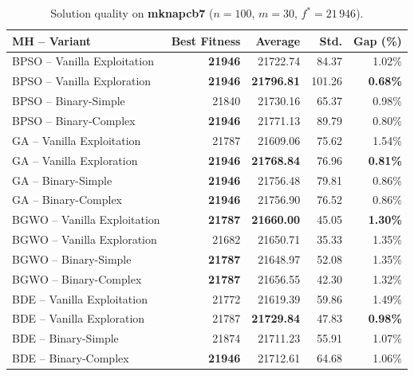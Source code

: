 \documentclass[journal,article,submit,moreauthors]{Definitions/mdpi}
\begin{document}
\begin{table}[htbp]
  \centering
  \small
  \caption{Solution quality on \textbf{mknapcb7}
  ($n=100$, $m=30$, $f^*=21\,946$).}
  \label{tab:calidad_mknapcb7}
  \begin{tabular}{lrrrr}
    \toprule
    \textbf{MH -- Variant} &
    \textbf{Best Fitness} &
    \textbf{Average} &
    \textbf{Std.} &
    \textbf{Gap (\%)} \\
    \midrule
    BPSO -- Vanilla Exploitation & \textbf{21946} & 21722.74 & 84.37 & 1.02\% \\
    BPSO -- Vanilla Exploration  & \textbf{21946} & \textbf{21796.81} & 101.26 & \textbf{0.68\%} \\
    BPSO -- Binary-Simple        & 21840 & 21730.16 & 65.37 & 0.98\% \\
    BPSO -- Binary-Complex       & \textbf{21946} & 21771.13 & 89.79 & 0.80\% \\
    \midrule
    GA -- Vanilla Exploitation   & 21787 & 21609.06 & 75.62 & 1.54\% \\
    GA -- Vanilla Exploration    & \textbf{21946} & \textbf{21768.84} & 76.96 & \textbf{0.81\%} \\
    GA -- Binary-Simple          & \textbf{21946} & 21756.48 & 79.81 & 0.86\% \\
    GA -- Binary-Complex         & \textbf{21946} & 21756.90 & 76.52 & 0.86\% \\
    \midrule
    BGWO -- Vanilla Exploitation & \textbf{21787} & \textbf{21660.00} & 45.05 & \textbf{1.30\%} \\
    BGWO -- Vanilla Exploration  & 21682 & 21650.71 & 35.33 & 1.35\% \\
    BGWO -- Binary-Simple        & \textbf{21787} & 21648.97 & 52.08 & 1.35\% \\
    BGWO -- Binary-Complex       & \textbf{21787} & 21656.55 & 42.30 & 1.32\% \\
    \midrule
    BDE -- Vanilla Exploitation  & 21772 & 21619.39 & 59.86 & 1.49\% \\
    BDE -- Vanilla Exploration   & 21787 & \textbf{21729.84} & 47.83 & \textbf{0.98\%} \\
    BDE -- Binary-Simple         & 21874 & 21711.23 & 55.91 & 1.07\% \\
    BDE -- Binary-Complex        & \textbf{21946} & 21712.61 & 64.68 & 1.06\% \\
    \bottomrule
  \end{tabular}
\end{table}
\end{document}
